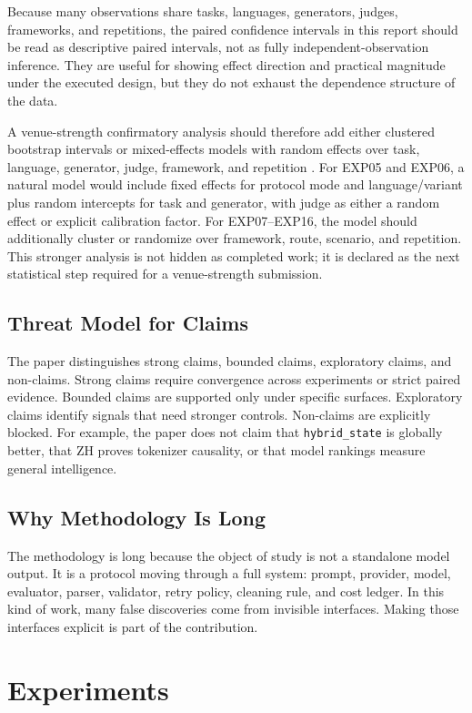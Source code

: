 \documentclass[11pt]{article}
\begin{document}
Because many observations share tasks, languages, generators, judges, frameworks, and repetitions, the paired confidence intervals in this report should be read as descriptive paired intervals, not as fully independent-observation inference. They are useful for showing effect direction and practical magnitude under the executed design, but they do not exhaust the dependence structure of the data.

A venue-strength confirmatory analysis should therefore add either clustered bootstrap intervals \cite{efron1994bootstrap} or mixed-effects models with random effects over task, language, generator, judge, framework, and repetition \cite{bates2015lme4}. For EXP05 and EXP06, a natural model would include fixed effects for protocol mode and language/variant plus random intercepts for task and generator, with judge as either a random effect or explicit calibration factor. For EXP07--EXP16, the model should additionally cluster or randomize over framework, route, scenario, and repetition. This stronger analysis is not hidden as completed work; it is declared as the next statistical step required for a venue-strength submission.

\subsection{Threat Model for Claims}
The paper distinguishes strong claims, bounded claims, exploratory claims, and non-claims. Strong claims require convergence across experiments or strict paired evidence. Bounded claims are supported only under specific surfaces. Exploratory claims identify signals that need stronger controls. Non-claims are explicitly blocked. For example, the paper does not claim that \texttt{hybrid\_state} is globally better, that ZH proves tokenizer causality, or that model rankings measure general intelligence.

\subsection{Why Methodology Is Long}
The methodology is long because the object of study is not a standalone model output. It is a protocol moving through a full system: prompt, provider, model, evaluator, parser, validator, retry policy, cleaning rule, and cost ledger. In this kind of work, many false discoveries come from invisible interfaces. Making those interfaces explicit is part of the contribution.

\section{Experiments}
\end{document}
